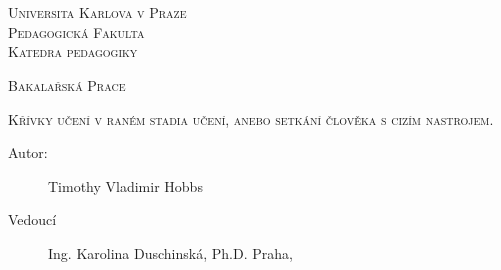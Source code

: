 \documentclass[a4paper,12pt,twoside,czech,cleardoublepage=empty]{scrreprt}
\newcommand{\SubjectCs}{Bakalařská Prace}
\newcommand{\TitleCs}{Křívky učení v raném stadia učení, anebo setkání člověka s cizím nastrojem.}
\newcommand{\AuthorName}{Timothy Vladimir Hobbs}
\newcommand{\SupervisorName}{Ing. Karolina Duschinská, Ph.D.}
\newcommand{\IssuedIn}{Praha}
\newcommand{\DepartmentCs}{Katedra pedagogiky}
\newcommand{\noun}[1]{\textsc{#1}}
\begin{document}
~\thispagestyle{empty}\vfill{}

\clearpage{}~\thispagestyle{empty}\begin{center}\vspace{10mm}


\textsf{\textsc{\noun{\LARGE Universita Karlova v Praze}}}\\
\vspace{0.5em}
\textsf{\textsc{\noun{\LARGE Pedagogická Fakulta}}}\\
\vspace*{1em}
\textsf{\textsc{\noun{\Large \DepartmentCs}}}\vspace{15mm}


\vspace{15mm}

\textsf{\textsc{\noun{\huge \SubjectCs}}}{\huge \par}

\vspace{15mm}


\textsf{\textsc{\noun{\LARGE \TitleCs}}}{\LARGE \par}


\vspace{10mm}


\end{center} 

\vspace*{\fill}


\vspace{10mm}


\begin{description}
\item [{{\large Autor:}}] \noindent \textsf{\large \AuthorName}{\large \par}
\item [{{\large Vedoucí}}] \noindent \textsf{\large \SupervisorName}%
{\large \hfill{}}\textsf{\large \IssuedIn, \the\year}{\large{}
}{\large \par}
\end{description}

\clearpage{}~\thispagestyle{empty}

{\small %
\ }{\small \par}

\noindent {\small \vfill{}
~}{\small \par}
\end{document}
